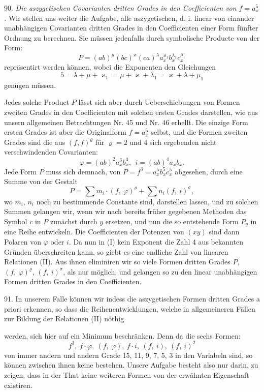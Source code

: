 \documentclass[11pt]{article}
\providecommand{\gesperrt}[1]{\textls[130]{#1}}
\providecommand{\weberpage}[1]{}
\providecommand{\weq}[2]{\begin{equation}\tag{#1}#2\end{equation}}
\begin{document}
90. \textit{Die aszygetischen Covarianten dritten Grades in den Coefficienten von $f=a_x^5$.} Wir stellen uns weiter die Aufgabe, alle aszygetischen, d. i. linear von einander unabhängigen Covarianten dritten Grades in den Coefficienten einer Form fünfter Ordnung zu berechnen. Sie müssen jedenfalls durch symbolische Producte von der Form:
\weq{I}{P = (ab)^\mu (bc)^\varkappa (ca)^\lambda a_x^{\varkappa_1} b_x^{\lambda_1} c_x^{\mu_1}}
repräsentirt werden können, wobei die Exponenten den Gleichungen
\[
5 = \lambda + \mu + \varkappa_1 = \mu + \varkappa + \lambda_1 = \varkappa + \lambda + \mu_1
\]
genügen müssen.

Jedes solche Product $P$ lässt sich aber durch Ueberschiebungen von Formen zweiten Grades in den Coefficienten mit solchen ersten Grades darstellen, wie aus unsern allgemeinen Betrachtungen Nr. 45 und Nr. 46 erhellt. Die einzige Form ersten Grades ist aber die Originalform $f=a_x^5$ selbst, und die Formen zweiten Grades sind die aus $(f, f)^\varrho$ für $\varrho = 2$ und 4 sich ergebenden nicht verschwindenden Covarianten:
\[
\varphi = (ab)^2 a_x^3 b_x^3,\ \ i = (ab)^4 a_x b_x.
\]
Jede Form $P$ muss sich demnach, von $P = f^3 = a_x^5 b_x^5 c_x^5$ abgesehen, durch eine Summe von der Gestalt
\weq{II}{P = \sum m_i \cdot (f,\ \varphi)^\varrho + \sum n_i (f,\ i)^\sigma,}
wo $m_i$, $n_i$ noch zu bestimmende Constante sind, darstellen lassen, und zu solchen Summen gelangen wir, wenn wir nach bereits früher gegebenen Methoden das Symbol $c$ in $P$ zunächst durch $y$ ersetzen, und nun die so entstehende Form $P_y$ in eine Reihe entwickeln. Die Coefficienten der Potenzen von $(xy)$ sind dann Polaren von $\varphi$ oder $i$. Da nun in (I) kein Exponent die Zahl 4 aus bekannten Gründen überschreiten kann, so giebt es eine endliche Zahl von linearen Relationen (II). Aus ihnen eliminiren wir so viele Formen dritten Grades $P$, $(f,\ \varphi)^\varrho$, $(f,\ i)^\sigma$, als nur möglich, und gelangen so zu den linear unabhängigen Formen dritten Grades in den Coefficienten.

91. In unserem Falle können wir indess die aszygetischen Formen dritten Grades a priori erkennen, so dass die Reihenentwicklungen, welche in allgemeineren Fällen zur Bildung der Relationen (II) nöthig


\weberpage{94}
werden, sich hier auf ein Minimum beschränken. Denn da die sechs Formen:
\[
f^3,\ f\cdot\varphi,\ (f,\ \varphi),\ f\cdot i,\ (f,\ i),\ (f,\ i)^2
\]
von immer andern und andern Grade 15, 11, 9, 7, 5, 3 in den Variabeln sind, so können zwischen ihnen keine \gesperrt{linearen Relationen} bestehen. Unsere Aufgabe besteht also nur darin, zu zeigen, dass in der That keine weiteren Formen von der erwähnten Eigenschaft existiren.
\end{document}

